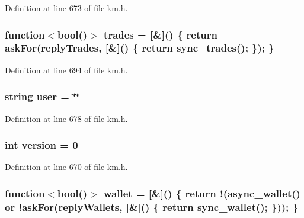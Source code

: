 Definition at line 673 of file km.\+h.

\subsubsection[{\texorpdfstring{trades}{trades}}]{\setlength{\rightskip}{0pt plus 5cm}function$<$bool()$>$ trades = \mbox{[}\&\mbox{]}() \{ return {\bf ask\+For}({\bf reply\+Trades}, \mbox{[}\&\mbox{]}() \{ return {\bf sync\+\_\+trades}(); \}); \}}\hypertarget{class_k_1_1_gw_a2e04da03fb9d2f9179864a70244aedb9}{}\label{class_k_1_1_gw_a2e04da03fb9d2f9179864a70244aedb9}


Definition at line 694 of file km.\+h.

\subsubsection[{\texorpdfstring{user}{user}}]{\setlength{\rightskip}{0pt plus 5cm}string user = \char`\"{}\char`\"{}}\hypertarget{class_k_1_1_gw_ae315dc7095b2ab26df1efb90a58f6345}{}\label{class_k_1_1_gw_ae315dc7095b2ab26df1efb90a58f6345}


Definition at line 678 of file km.\+h.

\subsubsection[{\texorpdfstring{version}{version}}]{\setlength{\rightskip}{0pt plus 5cm}int version = 0}\hypertarget{class_k_1_1_gw_aad880fc4455c253781e8968f2239d56f}{}\label{class_k_1_1_gw_aad880fc4455c253781e8968f2239d56f}


Definition at line 670 of file km.\+h.

\subsubsection[{\texorpdfstring{wallet}{wallet}}]{\setlength{\rightskip}{0pt plus 5cm}function$<$bool()$>$ wallet = \mbox{[}\&\mbox{]}() \{ return !({\bf async\+\_\+wallet}() or !{\bf ask\+For}({\bf reply\+Wallets}, \mbox{[}\&\mbox{]}() \{ return {\bf sync\+\_\+wallet}(); \})); \}}\hypertarget{class_k_1_1_gw_a2381015e1bae39f4cfd8e158bec8161a}{}\label{class_k_1_1_gw_a2381015e1bae39f4cfd8e158bec8161a}


